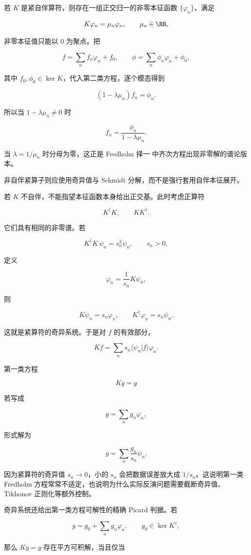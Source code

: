若 $K$ 是紧自伴算符，则存在一组正交归一的非零本征函数 $\{\varphi_n\}$，满足

\[
K\varphi_n=\mu_n\varphi_n,
\qquad \mu_n\in\RR,
\]

非零本征值只能以 $0$ 为聚点。把

\[
f=\sum_n f_n\varphi_n+f_0,
\qquad
\phi=\sum_n\phi_n\varphi_n+\phi_0,
\]

其中 $f_0,\phi_0\in\ker K$，代入第二类方程，逐个模态得到

\[
(1-\lambda\mu_n)f_n=\phi_n.
\]

所以当 $1-\lambda\mu_n\neq0$ 时

\[
{f_n=\frac{\phi_n}{1-\lambda\mu_n}}.
\]

当 $\lambda=1/\mu_n$ 时分母为零，这正是 Fredholm 择一 中齐次方程出现非零解的谱论版本。

非自伴紧算子则应使用奇异值与 Schmidt 分解，而不是强行套用自伴本征展开。

若 $K$ 不自伴，不能指望本征函数本身给出正交基。此时考虑正算符

\[
K^\dagger K,\qquad KK^\dagger.
\]

它们具有相同的非零谱。若

\[
K^\dagger K\,\psi_n=s_n^2\psi_n,
\qquad s_n>0,
\]

定义

\[
\varphi_n=\frac1{s_n}K\psi_n,
\]

则

\[
K\psi_n=s_n\varphi_n,
\qquad
K^\dagger\varphi_n=s_n\psi_n.
\]

这就是紧算符的奇异系统。于是对 $f$ 的有效部分，

\[
Kf=\sum_n s_n\langle\psi_n|f\rangle\varphi_n.
\]

第一类方程

\[
Ky=g
\]

若写成

\[
g=\sum_n g_n\varphi_n,
\]

形式解为

\[
y=\sum_n\frac{g_n}{s_n}\psi_n.
\]

因为紧算符的奇异值 $s_n\to0$，小的 $s_n$ 会把数据误差放大成 $1/s_n$。这说明第一类 Fredholm 方程常常不适定，也说明为什么实际反演问题需要截断奇异值、Tikhonov 正则化等额外控制。

奇异系统还给出第一类方程可解性的精确 Picard 判据。若

\[
g=g_0+\sum_ng_n\varphi_n,
\qquad g_0\in\ker K^\dagger,
\]

那么 $Ky=g$ 存在平方可积解，当且仅当

